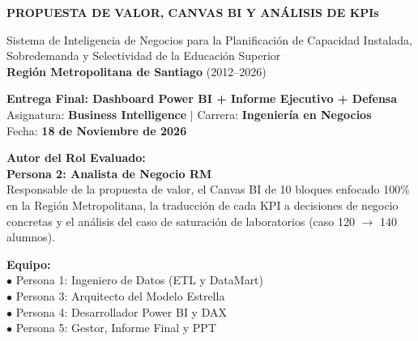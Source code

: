 \documentclass[11pt,a4paper]{article}
\begin{document}
\begin{titlepage}
    \centering
    \vspace*{0.8cm}
    {\Huge\bfseries\color{primaryblue}
      PROPUESTA DE VALOR, CANVAS BI Y ANÁLISIS DE KPIs\par}
    \vspace{0.4cm}
    {\LARGE\color{secondaryblue}
      Sistema de Inteligencia de Negocios para la Planificación de Capacidad
      Instalada, Sobredemanda y Selectividad de la Educación Superior\\[4pt]
      \textbf{Región Metropolitana de Santiago} (2012--2026)\par}
    \vspace{0.9cm}

    \begin{tcolorbox}[colback=lightbg, colframe=primaryblue, width=\textwidth, arc=3mm]
        \centering
        \large\textbf{Entrega Final: Dashboard Power BI + Informe Ejecutivo + Defensa}\\[2mm]
        \normalsize Asignatura: \textbf{Business Intelligence} $|$
        Carrera: \textbf{Ingeniería en Negocios}\\[1mm]
        Fecha: \textbf{18 de Noviembre de 2026}
    \end{tcolorbox}

    \vspace{1.5cm}
    \begin{minipage}{0.47\textwidth}
        \textbf{Autor del Rol Evaluado:}\\
        \textbf{\color{primaryblue}Persona 2: Analista de Negocio RM}\\[2pt]
        \small Responsable de la propuesta de valor, el Canvas BI de 10 bloques enfocado
        100\% en la Región Metropolitana, la traducción de cada KPI a decisiones de
        negocio concretas y el análisis del caso de saturación de laboratorios
        (caso 120 $\rightarrow$ 140 alumnos).
    \end{minipage}
    \hfill
    \begin{minipage}{0.47\textwidth}
        \textbf{Equipo:}\\
        $\bullet$ Persona 1: Ingeniero de Datos (ETL y DataMart)\\
        $\bullet$ Persona 3: Arquitecto del Modelo Estrella\\
        $\bullet$ Persona 4: Desarrollador Power BI y DAX\\
        $\bullet$ Persona 5: Gestor, Informe Final y PPT
    \end{minipage}


\end{titlepage}
\end{document}
